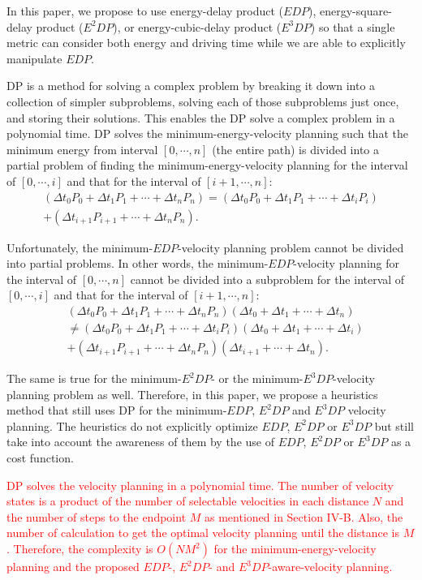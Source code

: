 \documentclass{IEEEtran}
\begin{document}
In this paper, we propose to use energy-delay product ($EDP$), energy-square-delay product ($E^2DP$), or energy-cubic-delay product ($E^3DP$) so that a single metric can consider both energy and driving time while we are able to explicitly manipulate $EDP$.

DP is a method for solving a complex problem by breaking it down into a collection of simpler subproblems, solving each of those subproblems just once, and storing their solutions. This enables the DP solve a complex problem in a polynomial time. DP solves the minimum-energy-velocity planning such that the minimum energy from interval $[0,\cdots,n]$ (the entire path) is divided into a partial problem of finding the minimum-energy-velocity planning for the interval of $[0, \cdots, i]$ and that for the interval of  $[i+1, \cdots, n]$:
%
\begin{align}
 (\Delta t_0 P_0 + \Delta t_1 P_1 + \cdots + \Delta t_n P_n)
 = (\Delta t_0 P_0 + \Delta t_1 P_1 + \cdots + \Delta t_i P_i) \nonumber \\
 + (\Delta t_{i+1} P_{i+1} + \cdots + \Delta t_n P_n).
\end{align}

Unfortunately, the minimum-$EDP$-velocity planning problem cannot be divided into partial problems. In other words, the minimum-$EDP$-velocity planning for the interval of $[0, \cdots, n]$ cannot be divided into a subproblem for the interval of $[0, \cdots,  i]$ and that for the interval of $[i+1,\cdots, n]$:
%
\begin{align}
&(\Delta t_0 P_0 + \Delta t_1 P_1 + \cdots + \Delta t_n P_n)(\Delta t_0 + \Delta t_1 + \cdots + \Delta t_n) \nonumber \\ 
&\neq (\Delta t_0 P_0 + \Delta t_1 P_1 + \cdots + \Delta t_i P_i)(\Delta t_0 + \Delta t_1 + \cdots + \Delta t_i) \nonumber \\
&+ (\Delta t_{i+1} P_{i+1} + \cdots + \Delta t_n P_n)(\Delta t_{i+1} + \cdots + \Delta t_n).
\end{align} 

The same is true for the minimum-$E^2DP$- or the minimum-$E^3DP$-velocity planning problem as well. Therefore, in this paper, we propose a heuristics method that still uses DP for the minimum-$EDP$, $E^2DP$ and $E^3DP$ velocity planning. The heuristics do not explicitly optimize $EDP$, $E^2DP$ or $E^3DP$ but still take into account the awareness of them by the use of $EDP$, $E^2DP$ or $E^3DP$ as a cost function. 

\textcolor{red}{DP solves the velocity planning in a polynomial time. The number of velocity states is a product of the number of selectable velocities in each distance $N$ and the number of steps to the endpoint $M$ as mentioned in Section IV-B. Also, the number of calculation to get the optimal velocity planning until the distance is $M$. Therefore, the complexity is $O(NM^2)$ for the minimum-energy-velocity planning and the proposed $EDP$-, $E^2DP$- and $E^3DP$-aware-velocity planning.} 
\end{document}
